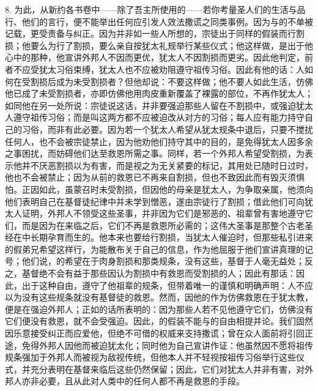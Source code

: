 8. 为此，从新约各书卷中——除了吾主所使用的——若你考量圣人们的生活与品行、他们的言行，便不能举出任何应引发人效法撒谎之同类事例。因为与的不单被记载，更受责备与纠正。因为并非如一些人所想的，宗徒出于同样的假装而行割损；他要么为行了割损，要么亲自按犹太礼规举行某些仪式；他这样做，是出于他心中的那种，他宣讲外邦人不因而更优，犹太人不因割损而更劣。因此他判定，前者不应受犹太习俗束缚，犹太人也不应被劝阻遵守祖传习俗。因此有他的话：人如何在受割损后成为未受割损者？但他却说：不要这样做；他不要人如此生活，仿佛他已成了未受割损者，亦即仿佛他用肉皮重新覆盖了裸露的部位，不再作犹太人；如同他在另一处所说：宗徒说这话，并非要强迫那些人留在不割损中，或强迫犹太人遵守祖传习俗；而是叫这两方都不应被迫改从对方的习俗；每人应有能力持守自己的习俗，而非有此必要。因为若一个犹太人希望从犹太规条中退后，只要不搅扰任何人，也不会被宗徒禁止，因为他劝他们持守其中的目的，是免得犹太人因多余之事困扰，而妨碍他们达至救恩所需之事。同样，若一个外邦人希望受割损，为表示他并不厌恶割损以为有害，而是视之为无关紧要的标记，其用处已随时日过时，他也不会被禁止；因为从前的救恩已不再来自割损，但也不致因此而有毁灭须惧怕。正因如此，虽蒙召时未受割损，但因他的母亲是犹太人，为争取亲属，他须向他们表明自己在基督徒纪律中并未学到憎恶，遂由宗徒行了割损；借此他们可向犹太人证明，外邦人不领受这些圣事，并非因为它们是邪恶的、祖辈曾有害地遵守它们，而是因为在来临之后，它们不再是救恩所必需的；这伟大圣事是那整个古老圣经在中长期孕育而生的。他本来也要给行割损，当犹太人催迫时，但那些私引进来的假弟兄希望这样行，为能散布关于自己的信息，作为他屈服于他们宣讲真理的记号；他们说，的希望在于肉身割损和那类规条，没有这些，基督于人毫无益处；反之，基督绝不会有益于那些因认为割损中有救恩而受割损的人；因此有那话：因此，出于这种自由，遵守了他祖辈的规条，但带着唯一的谨慎和明确声明：人不应以为没有这些规条就没有基督徒的救恩。然而，因他的作为仿佛救恩在于犹太教，便是在强迫外邦人；正如的话所表明的：因为那些人若不见他遵守它们，仿佛没有它们便没有救恩，就不会受强迫。因此，的假装不能与的自由相提并论。我们固然因乐意接受纠正而应爱他，但绝不可借的权威来支持撒谎；曾在众人面前将引回正途，免得外邦人因他而被迫犹太化；同时他为自己宣讲作证：他虽然因不愿将祖传规条强加于外邦人而被视为敌视传统，但他本人并不轻视按祖传习俗举行这些仪式，并充分表明在基督来临后这些仍然保留；因此，它们对犹太人并非有害，对外邦人亦非必要，且从此对人类中的任何人都不再是救恩的手段。\par

